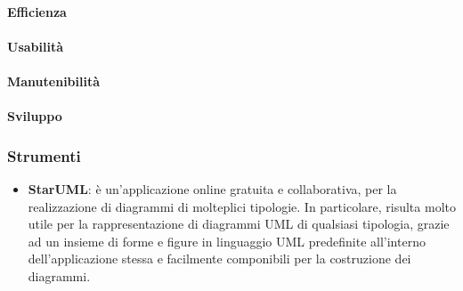             \paragraph{Efficienza}
            \paragraph{Usabilità}
            \paragraph{Manutenibilità}
            \paragraph{Sviluppo}
\fi
    
        \subsubsection{Strumenti}
            \begin{itemize}
                \item\textbf{StarUML}: è un'applicazione online gratuita e collaborativa, per la realizzazione di diagrammi di molteplici tipologie. In particolare, risulta molto utile per la rappresentazione di diagrammi UML di qualsiasi tipologia, grazie ad un insieme di forme e figure in linguaggio UML predefinite all'interno dell'applicazione stessa e facilmente componibili per la costruzione dei diagrammi.
            \end{itemize}
            
            
            
            
            
            
            
            
            
            
            
            
            
            
            
\newpage        
                